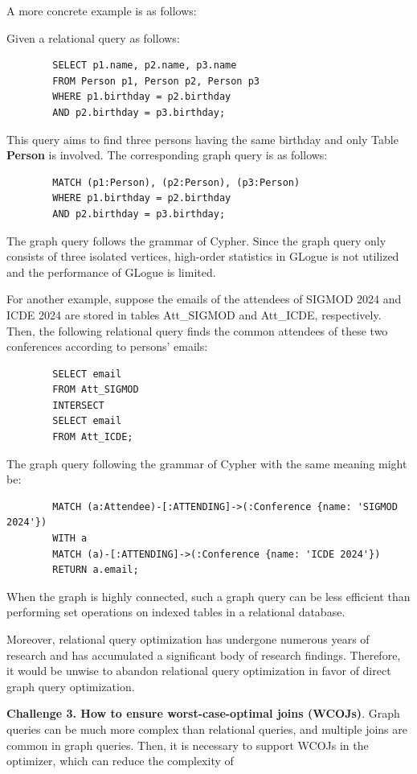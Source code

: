 A more concrete example is as follows:
\begin{example}
    Given a relational query as follows:
    \begin{lstlisting}
        SELECT p1.name, p2.name, p3.name 
        FROM Person p1, Person p2, Person p3
        WHERE p1.birthday = p2.birthday
        AND p2.birthday = p3.birthday;
    \end{lstlisting}
    This query aims to find three persons having the same birthday and only Table \textbf{Person} is involved.
    The corresponding graph query is as follows:
    \begin{lstlisting}
        MATCH (p1:Person), (p2:Person), (p3:Person)
        WHERE p1.birthday = p2.birthday
        AND p2.birthday = p3.birthday;
    \end{lstlisting}
    The graph query follows the grammar of Cypher.
    Since the graph query only consists of three isolated vertices, high-order statistics in GLogue is not utilized and the performance of GLogue is limited.

    For another example, suppose the emails of the attendees of SIGMOD 2024 and ICDE 2024 are stored in tables Att\_SIGMOD and Att\_ICDE, respectively.
    Then, the following relational query finds the common attendees of these two conferences according to persons' emails:
    \begin{lstlisting}
        SELECT email
        FROM Att_SIGMOD
        INTERSECT
        SELECT email
        FROM Att_ICDE;
    \end{lstlisting}
    The graph query following the grammar of Cypher with the same meaning might be:
    \begin{lstlisting}
        MATCH (a:Attendee)-[:ATTENDING]->(:Conference {name: 'SIGMOD 2024'})
        WITH a
        MATCH (a)-[:ATTENDING]->(:Conference {name: 'ICDE 2024'})
        RETURN a.email;
    \end{lstlisting}
    When the graph is highly connected, such a graph query can be less efficient than performing set operations on indexed tables in a relational database.
\end{example}
Moreover, relational query optimization has undergone numerous years of research and has accumulated a significant body of research findings.
Therefore, it would be unwise to abandon relational query optimization in favor of direct graph query optimization.


\textbf{Challenge 3. How to ensure worst-case-optimal joins (WCOJs)}.
Graph queries can be much more complex than relational queries, and multiple joins are common in graph queries.
Then, it is necessary to support WCOJs in the optimizer, which can reduce the complexity of 


